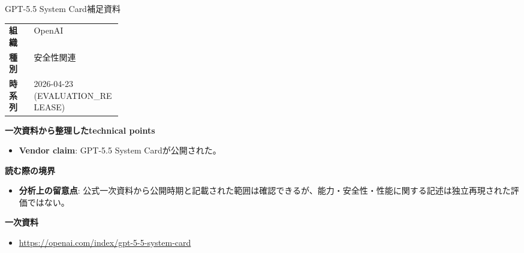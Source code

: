 \begin{technicalnote}{GPT-5.5 System Card}{補足資料}
\begingroup
\begin{tabularx}{\linewidth}{@{}>{\bfseries}p{0.22\linewidth}X@{}}
組織 & OpenAI \\
種別 & 安全性関連 \\
時系列 & 2026-04-23 (EVALUATION\_RELEASE) \\
\end{tabularx}
\smallskip
{\bfseries 一次資料から整理したtechnical points}
\begin{itemize}[leftmargin=1.5em,itemsep=0.35em]
\item \textbf{Vendor claim}: GPT-5.5 System Cardが公開された。
\end{itemize}
{\bfseries 読む際の境界}
\begin{itemize}[leftmargin=1.5em,itemsep=0.35em]
\item \textbf{分析上の留意点}: 公式一次資料から公開時期と記載された範囲は確認できるが、能力・安全性・性能に関する記述は独立再現された評価ではない。
\end{itemize}
\begin{samepage}
{\bfseries 一次資料}
\begingroup\sloppy
\begin{itemize}[leftmargin=1.5em,itemsep=0.25em]
\item {\scriptsize\url{https://openai.com/index/gpt-5-5-system-card}}
\end{itemize}
\endgroup
\end{samepage}
\endgroup
\end{technicalnote}
\medskip

